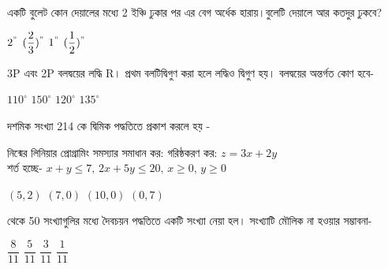 \documentclass[addpoints]{exam}
\begin{document}
\begin{questions}
\begin{oneparchoices}
\end{oneparchoices}

\question  একটি বুলেট কোন দেয়ালের মধ্যে 2 ইঞ্চি ঢুকার পর এর বেগ অর্ধেক হারায়।বুলেটি দেয়ালে আর কতদুর ঢুকবে?

\begin{oneparchoices}
\choice $ 2^{"} $
\choice $ (\dfrac{2}{3})^{"} $
\choice $ 1^{"} $
\choice $ (\dfrac{1}{2})^{"} $

\end{oneparchoices}

\question  3P এবং 2P বলদ্বয়ের লদ্ধি R। প্রথম বলটিদ্বিগুণ করা হলে লদ্ধিও দ্বিগুণ হয়। বলদ্বয়ের অন্তর্গত কোণ হবে-

\begin{oneparchoices}
\choice $ 110^{\circ} $
\choice $ 150^{\circ} $
\choice $ 120^{\circ} $
\choice $ 135^{\circ} $

\end{oneparchoices}

\question দশমিক সংখ্যা 214 কে দ্বিমিক পদ্ধতিতে প্রকাশ করলে হয় - 

\begin{oneparchoices}
\end{oneparchoices}

\question নিন্মের লিনিয়ার প্রোগ্রামিং সমস্যার সমাধান কর:
গরিষ্ঠকরণ কর: $ z=3x+2y $\\
শর্ত হচ্ছে-  $ x+y\le 7,\, 2x+5y\le 20,\, x\ge 0,\,y\ge 0 $


\begin{oneparchoices}
\choice $ (5,2) $
\choice $ (7,0) $
\choice $ (10,0) $
\choice $ (0,7) $
\end{oneparchoices}

 থেকে 50 সংখ্যাগুলির মধ্যে দৈবচয়ন পদ্ধতিতে একটি সংখ্যা নেয়া হল। সংখ্যাটি মৌলিক না হওয়ার সম্ভাবনা-

\begin{oneparchoices}
\choice $ \dfrac{8}{11} $
\choice  $ \dfrac{5}{11} $
\choice $ \dfrac{3}{11} $
\choice $ \dfrac{1}{11} $

\end{oneparchoices}

\end{questions}
\end{document}
